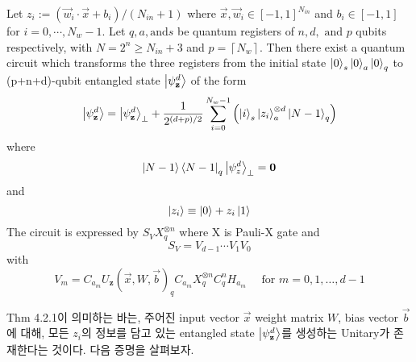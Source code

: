 \begin{theorem}
    Let \(z_i := \left( \vec{w}_i \cdot \vec{x} + b_i \right) / \left( N_{in} + 1 \right)\) where \(\vec{x}, \vec{w}_i \in [-1, 1]^{N_{in}}\) and \(b_i \in [-1, 1]\) for \(i = 0, \cdots, N_w - 1\). Let $q, a, \text{and} s$ be quantum registers of $n, d, \text{ and } p$ qubits respectively, with \( N = 2^n \ge N_{in} + 3 \) and \( p = \left\lceil N_{w} \right\rceil\). Then there exist a quantum circuit which transforms the three registers from the initial state \(\ket{0}_s \ket{0}_a \ket{0}_q\) to (p+n+d)-qubit entangled state \(\ket{\psi_{\mathbf z}^d}\) of the form 
    \[
        \ket{\psi_{\mathbf z}^d} = \ket{\psi_{\mathbf z}^d}_{\perp} + {1 \over {2^{(d + p) / 2}}}\sum_{i=0}^{N_w - 1}\left( \ket{i}_{s} \ket{z_i}_{a}^{\otimes d} \ket{N-1}_q \right)
    \]
    where
    \[
        \ket{N-1}\bra{N-1}_q \ket{\psi_z^d}_{\perp} = \mathbf{0}
    \]
    and
    \[
        \ket{z_i} \equiv \ket{0} + z_i\ket{1}
    \]  
    The circuit is expressed by $S_V X_q^{\otimes n}$ where X is Pauli-X gate and 
    \[
        S_V = V_{d-1} \cdots V_1 V_0
    \]
    with
    \[
        V_m = C_{a_m}U_{\mathbf{z}}(\vec{x}, W, \vec{b})_q C_{a_m}X^{\otimes n}_q C_q^nH_{a_m} \quad \text{ for } m = 0, 1, \dots, d - 1
    \]  
\end{theorem}

Thm 4.2.1이 의미하는 바는, 주어진 input vector \(\vec x\) weight matrix \(W\), bias vector \(\vec b\)에 대해, 모든 \(z_i\)의 정보를 담고 있는 entangled state $\ket{\psi_{\mathbf z}^d}$를 생성하는 Unitary가 존재한다는 것이다. 다음 증명을 살펴보자.

\begin{pf}

\end{pf}

